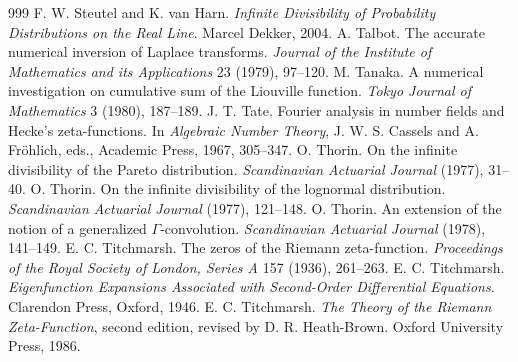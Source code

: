 \begin{thebibliography}{999}
 F. W. Steutel and K. van Harn. \emph{Infinite Divisibility of Probability Distributions on the Real Line}. Marcel Dekker, 2004.
 A. Talbot. The accurate numerical inversion of Laplace transforms. \emph{Journal of the Institute of Mathematics and its Applications} 23 (1979), 97--120.
 M. Tanaka. A numerical investigation on cumulative sum of the Liouville function. \emph{Tokyo Journal of Mathematics} 3 (1980), 187--189.
 J. T. Tate. Fourier analysis in number fields and Hecke's zeta-functions. In \emph{Algebraic Number Theory}, J. W. S. Cassels and A. Fr\"ohlich, eds., Academic Press, 1967, 305--347.
 O. Thorin. On the infinite divisibility of the Pareto distribution. \emph{Scandinavian Actuarial Journal} (1977), 31--40.
 O. Thorin. On the infinite divisibility of the lognormal distribution. \emph{Scandinavian Actuarial Journal} (1977), 121--148.
 O. Thorin. An extension of the notion of a generalized $\Gamma$-convolution. \emph{Scandinavian Actuarial Journal} (1978), 141--149.
 E. C. Titchmarsh. The zeros of the Riemann zeta-function. \emph{Proceedings of the Royal Society of London, Series A} 157 (1936), 261--263.
 E. C. Titchmarsh. \emph{Eigenfunction Expansions Associated with Second-Order Differential Equations}. Clarendon Press, Oxford, 1946.
 E. C. Titchmarsh. \emph{The Theory of the Riemann Zeta-Function}, second edition, revised by D. R. Heath-Brown. Oxford University Press, 1986.

\end{thebibliography}
